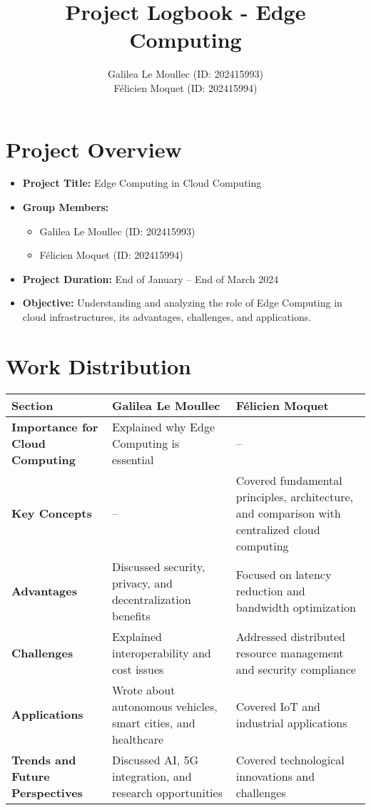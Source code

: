 \documentclass[a4paper,12pt]{article}
\title{Project Logbook - Edge Computing}
\author{Galilea Le Moullec (ID: 202415993) \\ Félicien Moquet (ID: 202415994)}
\date{}
\begin{document}
\maketitle

\section*{Project Overview}
\begin{itemize}
    \item \textbf{Project Title:} Edge Computing in Cloud Computing
    \item \textbf{Group Members:} 
    \begin{itemize}
        \item Galilea Le Moullec (ID: 202415993)
        \item Félicien Moquet (ID: 202415994)
    \end{itemize}
    \item \textbf{Project Duration:} End of January – End of March 2024
    \item \textbf{Objective:} Understanding and analyzing the role of Edge Computing in cloud infrastructures, its advantages, challenges, and applications.
\end{itemize}

\section*{Work Distribution}
\begin{longtable}{|p{4cm}|p{6cm}|p{6cm}|}
\hline
\textbf{Section} & \textbf{Galilea Le Moullec} & \textbf{Félicien Moquet} \\
\hline
\textbf{Importance for Cloud Computing} & Explained why Edge Computing is essential & -- \\
\hline
\textbf{Key Concepts} & -- & Covered fundamental principles, architecture, and comparison with centralized cloud computing \\
\hline
\textbf{Advantages} & Discussed security, privacy, and decentralization benefits & Focused on latency reduction and bandwidth optimization \\
\hline
\textbf{Challenges} & Explained interoperability and cost issues & Addressed distributed resource management and security compliance \\
\hline
\textbf{Applications} & Wrote about autonomous vehicles, smart cities, and healthcare & Covered IoT and industrial applications \\
\hline
\textbf{Trends and Future Perspectives} & Discussed AI, 5G integration, and research opportunities & Covered technological innovations and challenges \\
\hline
\end{longtable}
\end{document}
